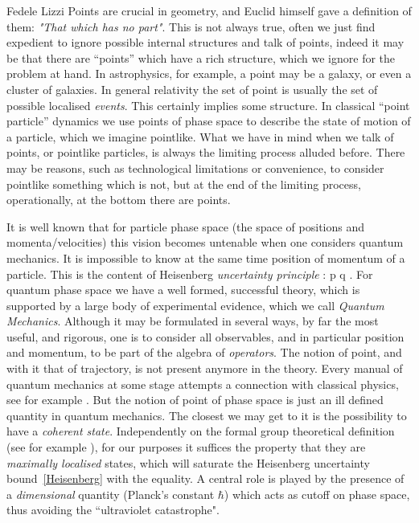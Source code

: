 \begin{artengenv}{Fedele Lizzi}
Points are crucial in geometry, and Euclid himself gave a definition of them: \emph{"That which has no part"}. This is not always true, often we just find expedient to ignore possible internal structures and talk of points, indeed it may be that there are ``points'' which have a rich structure, which we ignore for the problem at hand. 
In astrophysics, for example, a point may be a galaxy, or even a cluster of galaxies. 
In general relativity the set of point is usually the set of possible localised \emph{events}. This certainly implies some structure. 
In classical ``point particle'' dynamics we use points of phase space to describe the state of motion of a particle, which we imagine pointlike. What we have in mind when we talk of points, or pointlike particles, is always the limiting process alluded before. There may be reasons, such as technological limitations or convenience, to consider pointlike something which is not, but at the end of the limiting process, operationally, at the bottom there are points.

It is well known that for particle phase space (the space of positions and momenta/velocities) this vision becomes untenable when one considers quantum mechanics. It is impossible to know at the same time position of momentum of a particle. This is the content of Heisenberg \emph{uncertainty principle} \parencite{Heisenberguncert}:
\be
\Delta p \Delta q \geq \frac{} . \label{Heisenberg}
\ee
For quantum phase space we have a well formed, successful theory, which is supported by a large body of experimental evidence, which we call \emph{Quantum Mechanics}. Although it may be formulated in several ways, by far the most useful, and rigorous, one is to consider all observables, and in particular position and momentum, to be part of the algebra of \emph{operators}. The notion of point, and with it that of trajectory, is not present anymore in the theory. Every manual of quantum mechanics at some stage attempts a connection with classical physics, see for example \parencite[Sect.~II.4]{Messiah}. But the notion of point of phase space is just  an ill defined quantity in quantum mechanics. The closest we may get to it is the possibility to have a \emph{coherent state}. Independently on the formal group theoretical definition (see for example \cite{Perelomov}), for our purposes it suffices the property that they are \emph{maximally localised} states, which will saturate the Heisenberg uncertainty bound~\eqref{Heisenberg} with the equality. A central role is played by the presence of a \emph{dimensional} quantity (Planck's constant $\hbar$) which acts as cutoff on phase space, thus avoiding the ``ultraviolet catastrophe".


\end{artengenv}
